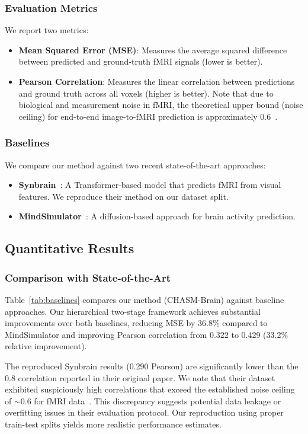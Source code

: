 \subsubsection{Evaluation Metrics}
We report two metrics:
\begin{itemize}
  \item \textbf{Mean Squared Error (MSE)}: Measures the average squared difference between
        predicted and ground-truth fMRI signals (lower is better).
  \item \textbf{Pearson Correlation}: Measures the linear correlation between predictions
        and ground truth across all voxels (higher is better).
        Note that due to biological and measurement noise in fMRI,
        the theoretical upper bound (noise ceiling) for end-to-end image-to-fMRI prediction
        is approximately 0.6~\cite{allen2022massive}.
\end{itemize}

\subsubsection{Baselines}
We compare our method against two recent state-of-the-art approaches:
\begin{itemize}
  \item \textbf{Synbrain}~\cite{synbrain}: A Transformer-based model that predicts fMRI from visual features.
        We reproduce their method on our dataset split.
  \item \textbf{MindSimulator}~\cite{mindsimulator}: A diffusion-based approach for brain activity prediction.
\end{itemize}


\subsection{Quantitative Results}

\subsubsection{Comparison with State-of-the-Art}

Table~\ref{tab:baselines} compares our method (CHASM-Brain) against baseline approaches.
Our hierarchical two-stage framework achieves substantial improvements over both baselines,
reducing MSE by 36.8\% compared to MindSimulator and improving Pearson correlation
from 0.322 to 0.429 (33.2\% relative improvement).

The reproduced Synbrain results (0.290 Pearson) are significantly lower than
the 0.8 correlation reported in their original paper.
We note that their dataset exhibited suspiciously high correlations that exceed
the established noise ceiling of $\sim$0.6 for fMRI data~\cite{allen2022massive}.
This discrepancy suggests potential data leakage or overfitting issues in their evaluation protocol.
Our reproduction using proper train-test splits yields more realistic performance estimates.

